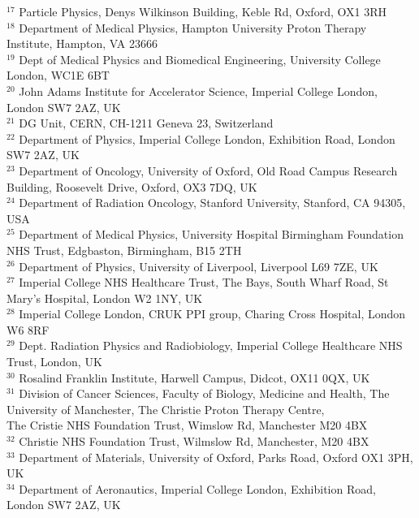 {\begin{tabbing}
     $^{17}$ \> Particle Physics, Denys Wilkinson Building, Keble Rd, Oxford, OX1 3RH\\
     $^{18}$ \> Department of Medical Physics, Hampton University Proton Therapy Institute, Hampton, VA 23666\\
     $^{19}$ \> Dept of Medical Physics and Biomedical Engineering, University College London, WC1E 6BT\\
     $^{20}$ \> John Adams Institute for Accelerator Science, Imperial College London, London SW7 2AZ, UK\\
     $^{21}$ \> DG Unit, CERN, CH-1211 Geneva 23, Switzerland\\
     $^{22}$ \> Department of Physics, Imperial College London, Exhibition Road, London SW7 2AZ, UK\\
     $^{23}$ \> Department of Oncology, University of Oxford, Old Road Campus Research Building, Roosevelt Drive, Oxford, OX3 7DQ, UK\\
     $^{24}$ \> Department of Radiation Oncology, Stanford University, Stanford, CA 94305, USA\\
     $^{25}$ \> Department of Medical Physics, University Hospital Birmingham Foundation NHS Trust, Edgbaston, Birmingham, B15 2TH\\
     $^{26}$ \> Department of Physics, University of Liverpool, Liverpool L69 7ZE, UK\\
     $^{27}$ \> Imperial College NHS Healthcare Trust, The Bays, South Wharf Road, St Mary's Hospital, London W2 1NY, UK\\
     $^{28}$ \> Imperial College London, CRUK PPI group, Charing Cross Hospital, London W6 8RF\\
     $^{29}$ \> Dept. Radiation Physics and Radiobiology, Imperial College Healthcare NHS Trust, London, UK\\
     $^{30}$ \> Rosalind Franklin Institute, Harwell Campus, Didcot, OX11 0QX, UK\\
     $^{31}$ \> Division of Cancer Sciences, Faculty of Biology, Medicine and Health, The University of Manchester, The Christie Proton Therapy Centre, \\ \> The Cristie NHS Foundation Trust, Wimslow Rd, Manchester M20 4BX\\
     $^{32}$ \> Christie NHS Foundation Trust, Wilmslow Rd, Manchester, M20 4BX\\
     $^{33}$ \> Department of Materials, University of Oxford, Parks Road, Oxford OX1 3PH, UK\\
     $^{34}$ \> Department of Aeronautics, Imperial College London, Exhibition Road, London SW7 2AZ, UK\\

\end{tabbing}}
